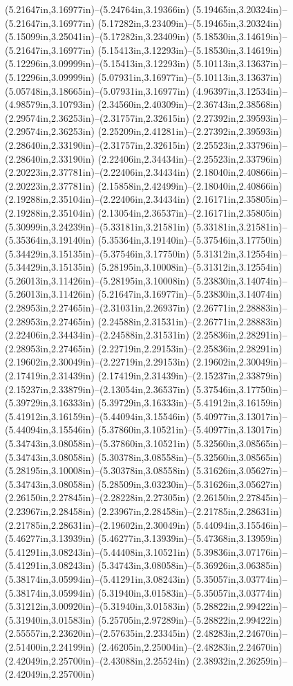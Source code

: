 (5.21647in,3.16977in)--(5.24764in,3.19366in) (5.19465in,3.20324in)--(5.21647in,3.16977in) (5.17282in,3.23409in)--(5.19465in,3.20324in) (5.15099in,3.25041in)--(5.17282in,3.23409in) (5.18530in,3.14619in)--(5.21647in,3.16977in) (5.15413in,3.12293in)--(5.18530in,3.14619in) (5.12296in,3.09999in)--(5.15413in,3.12293in) (5.10113in,3.13637in)--(5.12296in,3.09999in) (5.07931in,3.16977in)--(5.10113in,3.13637in) (5.05748in,3.18665in)--(5.07931in,3.16977in) (4.96397in,3.12534in)--(4.98579in,3.10793in) (2.34560in,2.40309in)--(2.36743in,2.38568in) (2.29574in,2.36253in)--(2.31757in,2.32615in) (2.27392in,2.39593in)--(2.29574in,2.36253in) (2.25209in,2.41281in)--(2.27392in,2.39593in) (2.28640in,2.33190in)--(2.31757in,2.32615in) (2.25523in,2.33796in)--(2.28640in,2.33190in) (2.22406in,2.34434in)--(2.25523in,2.33796in) (2.20223in,2.37781in)--(2.22406in,2.34434in) (2.18040in,2.40866in)--(2.20223in,2.37781in) (2.15858in,2.42499in)--(2.18040in,2.40866in) (2.19288in,2.35104in)--(2.22406in,2.34434in) (2.16171in,2.35805in)--(2.19288in,2.35104in) (2.13054in,2.36537in)--(2.16171in,2.35805in) (5.30999in,3.24239in)--(5.33181in,3.21581in) (5.33181in,3.21581in)--(5.35364in,3.19140in) (5.35364in,3.19140in)--(5.37546in,3.17750in) (5.34429in,3.15135in)--(5.37546in,3.17750in) (5.31312in,3.12554in)--(5.34429in,3.15135in) (5.28195in,3.10008in)--(5.31312in,3.12554in) (5.26013in,3.11426in)--(5.28195in,3.10008in) (5.23830in,3.14074in)--(5.26013in,3.11426in) (5.21647in,3.16977in)--(5.23830in,3.14074in) (2.28953in,2.27465in)--(2.31031in,2.26937in) (2.26771in,2.28883in)--(2.28953in,2.27465in) (2.24588in,2.31531in)--(2.26771in,2.28883in) (2.22406in,2.34434in)--(2.24588in,2.31531in) (2.25836in,2.28291in)--(2.28953in,2.27465in) (2.22719in,2.29153in)--(2.25836in,2.28291in) (2.19602in,2.30049in)--(2.22719in,2.29153in) (2.19602in,2.30049in)--(2.17419in,2.31439in) (2.17419in,2.31439in)--(2.15237in,2.33879in) (2.15237in,2.33879in)--(2.13054in,2.36537in) (5.37546in,3.17750in)--(5.39729in,3.16333in) (5.39729in,3.16333in)--(5.41912in,3.16159in) (5.41912in,3.16159in)--(5.44094in,3.15546in) (5.40977in,3.13017in)--(5.44094in,3.15546in) (5.37860in,3.10521in)--(5.40977in,3.13017in) (5.34743in,3.08058in)--(5.37860in,3.10521in) (5.32560in,3.08565in)--(5.34743in,3.08058in) (5.30378in,3.08558in)--(5.32560in,3.08565in) (5.28195in,3.10008in)--(5.30378in,3.08558in) (5.31626in,3.05627in)--(5.34743in,3.08058in) (5.28509in,3.03230in)--(5.31626in,3.05627in) (2.26150in,2.27845in)--(2.28228in,2.27305in) (2.26150in,2.27845in)--(2.23967in,2.28458in) (2.23967in,2.28458in)--(2.21785in,2.28631in) (2.21785in,2.28631in)--(2.19602in,2.30049in) (5.44094in,3.15546in)--(5.46277in,3.13939in) (5.46277in,3.13939in)--(5.47368in,3.13959in) (5.41291in,3.08243in)--(5.44408in,3.10521in) (5.39836in,3.07176in)--(5.41291in,3.08243in) (5.34743in,3.08058in)--(5.36926in,3.06385in) (5.38174in,3.05994in)--(5.41291in,3.08243in) (5.35057in,3.03774in)--(5.38174in,3.05994in) (5.31940in,3.01583in)--(5.35057in,3.03774in) (5.31212in,3.00920in)--(5.31940in,3.01583in) (5.28822in,2.99422in)--(5.31940in,3.01583in) (5.25705in,2.97289in)--(5.28822in,2.99422in) (2.55557in,2.23620in)--(2.57635in,2.23345in) (2.48283in,2.24670in)--(2.51400in,2.24199in) (2.46205in,2.25004in)--(2.48283in,2.24670in) (2.42049in,2.25700in)--(2.43088in,2.25524in) (2.38932in,2.26259in)--(2.42049in,2.25700in) 